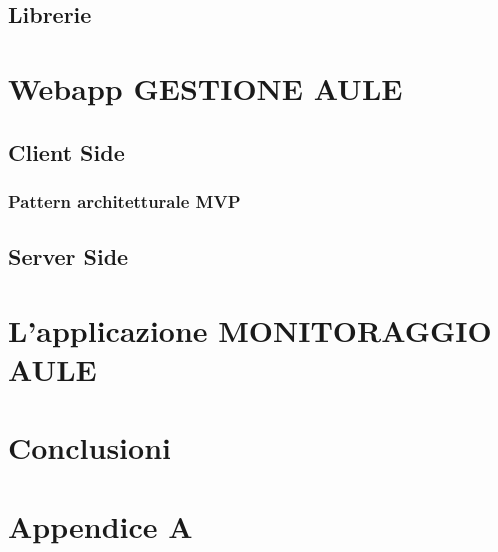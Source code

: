 \documentclass[a4paper,pt11,oneside]{book}
\begin{document}
\section{Librerie}


\chapter{Webapp GESTIONE AULE}


\section{Client Side}

\subsection{Pattern architetturale MVP}

\FloatBarrier



\section{Server Side}


\chapter{L'applicazione MONITORAGGIO AULE}


\chapter{Conclusioni}


\chapter{Appendice A}



\end{document}
